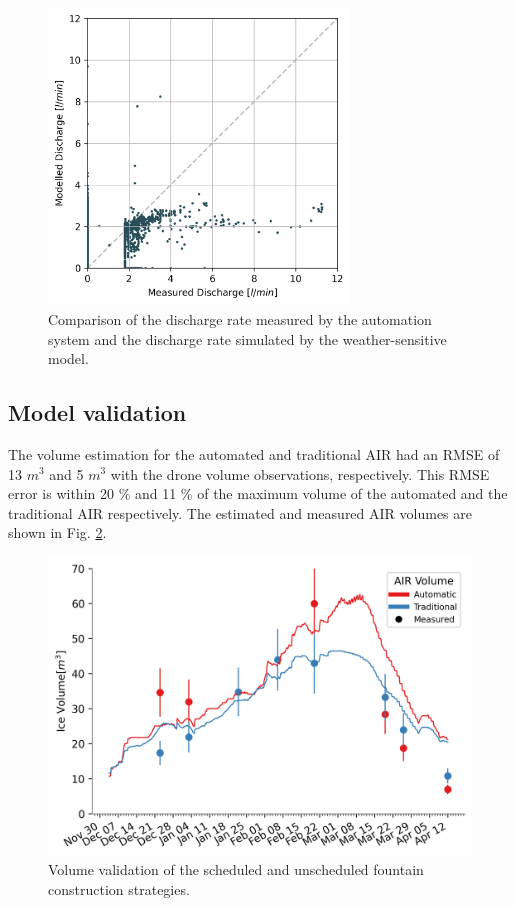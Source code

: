 \documentclass[tc, manuscript]{copernicus}
\begin{document}
\begin{figure}[t]
\includegraphics[width=8cm]{Figures/simvsreal2.png}

\caption{ Comparison of the discharge rate measured by the automation system and the discharge rate simulated by the weather-sensitive
model. }

\label{fig:simvsreal}
\end{figure}

\subsection{Model validation}

The volume estimation for the automated and traditional AIR had an RMSE of 13 $m^3$ and 5 $m^3$ with the drone
volume observations, respectively. This RMSE error is within 20 \% and 11 \% of the maximum volume of the
automated and the traditional AIR respectively. The estimated and measured AIR volumes are shown in Fig.
\ref{fig:validation}.  

\begin{figure}[t] \includegraphics[width=12cm] {Figures/validation.png} \caption{Volume validation of the
scheduled and unscheduled fountain construction strategies.} \label{fig:validation} \end{figure}
\end{document}
